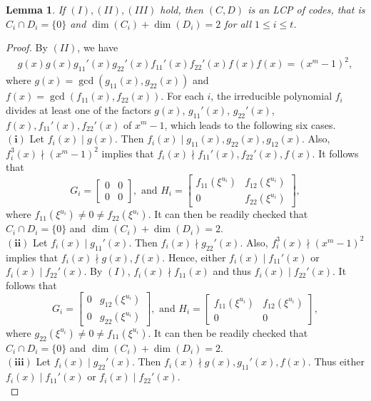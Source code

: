 \documentclass[12 pt]{extarticle}
\numberwithin{equation}{section}
\newtheorem{lemma}[theorem]{Lemma}
\theoremstyle{definition}
\begin{document}
\begin{lemma}\label{converse}
    If $(I),(II),(III)$ hold, then $(C,D)$ is an LCP of codes, that is $C_i\cap D_i=\{0\}$ and $\dim(C_i)+\dim(D_i)=2$ for all $1\leq i\leq t$.
\end{lemma}
\begin{proof}
By $(II)$, we have 
\begin{align}\label{con.1}
    g(x) g(x)g_{11}'(x)g_{22}'(x)f_{11}'(x)f_{22}'(x)f(x)f(x)=(x^m-1)^2,
\end{align}
where $g(x)=\gcd(g_{11}(x),g_{22}(x))$ and $f(x)=\gcd(f_{11}(x),f_{22}(x))$.
For each $i$, the irreducible polynomial $f_i$ divides at least one of the factors $g(x)$, $g_{11}'(x)$, $g_{22}'(x)$, $f(x),f_{11}'(x),f_{22}'(x)$ of $x^m-1$, which leads to the following six cases.  
\\
$\bm{(i)}$ Let $f_i(x)\mid g(x)$. Then $f_i(x)\mid g_{11}(x),g_{22}(x),g_{12}(x)$. Also, $f_i^3(x)\nmid (x^m-1)^2$ implies that $f_i(x)\nmid f_{11}'(x),f_{22}'(x),f(x)$. It follows that  
$$
G_i=   \begin{bmatrix}
0 & 0 \\
0 & 0 
\end{bmatrix} , \text{ and }
H_i=   \begin{bmatrix}
f_{11}(\xi^{u_i}) & f_{12}(\xi^{u_i}) \\
0 & f_{22}(\xi^{u_i})  
\end{bmatrix},$$
where $f_{11}(\xi^{u_i})\neq0\neq f_{22}(\xi^{u_i})$.
It can then be readily checked that $C_i \cap D_i= \{0\}$ and $\dim(C_i)+\dim(D_i)=2$.\\
$\bm{(ii)}$  Let $f_i(x)\mid g_{11}'(x)$. Then $f_i(x)\nmid g_{22}'(x)$. Also, $f_i^3(x)\nmid (x^m-1)^2$ implies that  $f_i(x)\nmid g(x),f(x)$.  Hence, either $f_i(x)\mid f_{11}'(x)$ or $f_i(x)\mid f_{22}'(x)$. By $(I)$, $f_i(x)\nmid f_{11}(x)$ and thus $f_i(x)\mid f_{22}'(x)$. It follows that 
$$
G_i=   \begin{bmatrix}
0 & g_{12}(\xi^{u_i}) \\
0 &  g_{22}(\xi^{u_i}) 
\end{bmatrix}, \text{ and }
H_i=   \begin{bmatrix}
f_{11}(\xi^{u_i}) & f_{12}(\xi^{u_i}) \\
0 & 0  
\end{bmatrix},
$$ where $g_{22}(\xi^{u_i})\neq0\neq f_{11}(\xi^{u_i})$.
It can then be readily checked that $C_i \cap D_i= \{0\}$ and $\dim(C_i)+\dim(D_i)=2$.\\
$\bm{(iii)}$ Let $f_i(x)\mid g_{22}'(x)$.  Then $f_i(x)\nmid g(x),g_{11}'(x),f(x)$. Thus either $f_i(x)\mid f_{11}'(x)$ or $f_i(x)\mid f_{22}'(x)$. \\

\end{proof}
\end{document}
